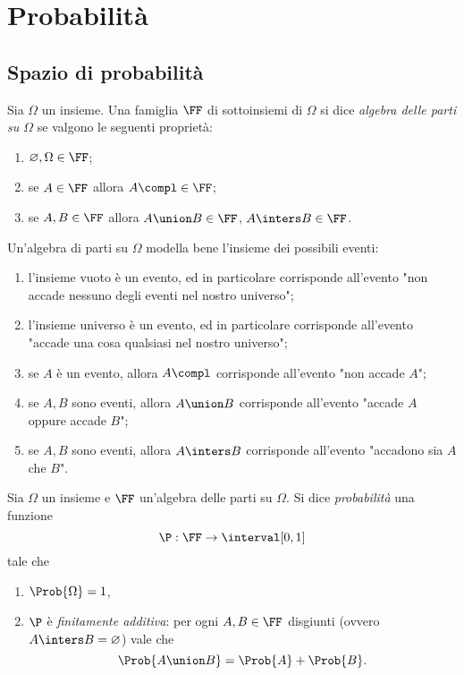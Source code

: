\chapter{Probabilità}

\section{Spazio di probabilità}

\begin{definition}
    Sia $\Omega$ un insieme. Una famiglia $\FF$ di sottoinsiemi di $\Omega$ si dice \emph{algebra delle parti su $\Omega$} se valgono le seguenti proprietà: \begin{enumerate}[label={(\roman*)}]
        \item $\varnothing, \Omega \in \FF$;
        \item se $A \in \FF$ allora $A\compl \in \FF$;
        \item se $A, B \in \FF$ allora $A \union B \in \FF$, $A \inters B \in \FF$.
    \end{enumerate}
\end{definition}

Un'algebra di parti su $\Omega$ modella bene l'insieme dei possibili eventi: \begin{enumerate}[label={(\roman*)}]
    \item l'insieme vuoto è un evento, ed in particolare corrisponde all'evento "non accade nessuno degli eventi nel nostro universo";
    \item l'insieme universo è un evento, ed in particolare corrisponde all'evento "accade una cosa qualsiasi nel nostro universo";
    \item se $A$ è un evento, allora $A\compl$ corrisponde all'evento "non accade $A$";
    \item se $A, B$ sono eventi, allora $A \union B$ corrisponde all'evento "accade $A$ oppure accade $B$";
    \item se $A, B$ sono eventi, allora $A \inters B$ corrisponde all'evento "accadono sia $A$ che $B$".
\end{enumerate}

\begin{definition}
    [Probabilità]
    Sia $\Omega$ un insieme e $\FF$ un'algebra delle parti su $\Omega$. Si dice \emph{probabilità} una funzione \[
        \P : \FF \to \interval[{0, 1}]  
    \] tale che \begin{enumerate}
        \item $\Prob{\Omega} = 1$,
        \item \label{def:prob_finit_add} $\P$ è \emph{finitamente additiva}: per ogni $A, B \in \FF$ disgiunti (ovvero $A \inters B = \varnothing$) vale che \[
            \Prob{A \union B} = \Prob{A} + \Prob{B}.
        \]
    \end{enumerate}
\end{definition}

